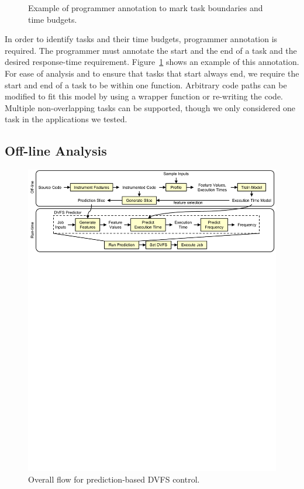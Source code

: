 \begin{figure}
\begin{center}
    \caption{Example of programmer annotation to mark task boundaries and time budgets.}
    \label{fig:system.programmer_annotation}
  \end{center}
\end{figure}

In order to identify tasks and their time budgets, programmer annotation is
required. The programmer must annotate the start and the end of a task and the
desired response-time requirement.
Figure~\ref{fig:system.programmer_annotation} shows an example of this
annotation.  For ease of analysis and to ensure that tasks that start always
end, we require the start and end of a task to be within one function.
Arbitrary code paths can be modified to fit this model by using a wrapper
function or re-writing the code. Multiple non-overlapping tasks can be
supported, though we only considered one task in the applications we tested.

\subsection{Off-line Analysis}

\begin{figure}
  \begin{center}
    \includegraphics{exec_time_prediction/figs/high_level_flow.pdf}
    \caption{Overall flow for prediction-based DVFS control.}
    \label{fig:system.high_level_flow}
  \end{center}
\end{figure}

